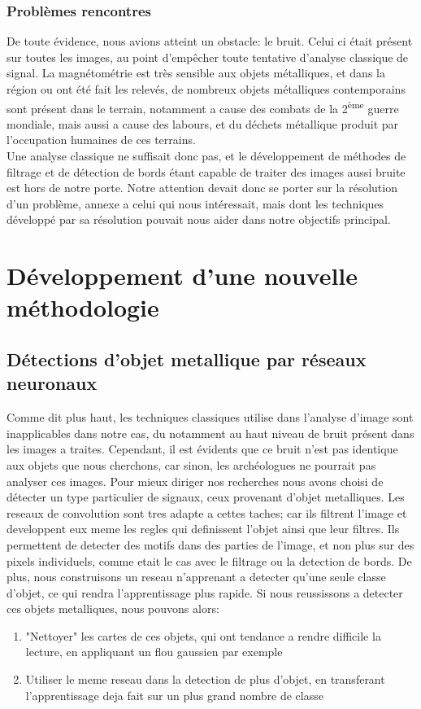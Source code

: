 \documentclass[a4paper, 12pt, titlepage, oneside, french]{article}
\begin{document}
	\subsubsection{Problèmes rencontres}
	De toute évidence, nous avions atteint un obstacle: le bruit. Celui ci était présent sur toutes les images, au point d'empêcher toute tentative d'analyse classique de signal. La magnétométrie est très sensible aux objets métalliques, et dans la région ou ont été fait les relevés, de nombreux objets métalliques contemporains sont présent dans le terrain, notamment a cause des combats de la 2\textsuperscript{ème} guerre mondiale, mais aussi a cause des labours, et du déchets métallique produit par l'occupation humaines de ces terrains.\\
	Une analyse classique ne suffisait donc pas, et le développement de méthodes de filtrage et de détection de bords étant capable de traiter des images aussi bruite est hors de notre porte. Notre attention devait donc se porter sur la résolution d'un problème, annexe a celui qui nous intéressait, mais dont les techniques développé par sa résolution pouvait nous aider dans notre objectifs principal.

\newpage
\section{Développement d'une nouvelle méthodologie}
	\subsection{Détections d'objet metallique par réseaux neuronaux}
	Comme dit plus haut, les techniques classiques utilise dans l'analyse d'image sont inapplicables dans notre cas, du notamment au haut niveau de bruit présent dans les images a traites. Cependant, il est évidents que ce bruit n'est pas identique aux objets que nous cherchons, car sinon, les archéologues ne pourrait pas analyser ces images. Pour mieux diriger nos recherches nous avons choisi de détecter un type particulier de signaux, ceux provenant d'objet metalliques. Les reseaux de convolution sont tres adapte a cettes taches; car ils filtrent l'image et developpent eux meme les regles qui definissent l'objet ainsi que leur filtres. Ils permettent de detecter des motifs dans des parties de l'image, et non plus sur des pixels individuels, comme etait le cas avec le filtrage ou la detection de bords. De plus, nous construisons un reseau n'apprenant a detecter qu'une seule classe d'objet, ce qui rendra l'apprentissage plus rapide. Si nous reussissons a detecter ces objets metalliques, nous pouvons alors:
	\begin{enumerate}
		\item "Nettoyer" les cartes de ces objets, qui ont tendance a rendre difficile la lecture, en appliquant un flou gaussien par exemple
		\item Utiliser le meme reseau dans la detection de plus d'objet, en transferant l'apprentissage deja fait sur un plus grand nombre de classe
	\end{enumerate}
\end{document}

